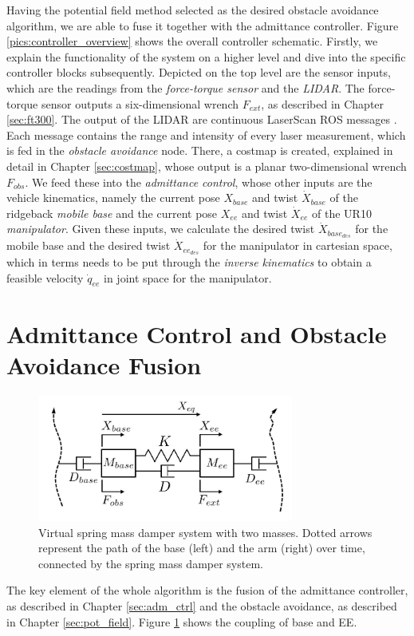 Having the potential field method selected as the desired obstacle avoidance algorithm, we are able to fuse it together with the admittance controller. Figure \ref{pics:controller_overview} shows the overall controller schematic. Firstly, we explain the functionality of the system on a higher level and dive into the specific controller blocks subsequently. Depicted on the top level are the sensor inputs, which are the readings from the \emph{force-torque sensor} and the \emph{LIDAR}. The force-torque sensor outputs a six-dimensional wrench $F_{ext}$, as described in Chapter \ref{sec:ft300}. The output of the LIDAR are continuous LaserScan ROS messages \citep{rosLaserscan}. Each message contains the range and intensity of every laser measurement, which is fed in the \emph{obstacle avoidance} node. There, a costmap is created, explained in detail in Chapter \ref{sec:costmap}, whose output is a planar two-dimensional wrench $F_{obs}$. We feed these into the \emph{admittance control}, whose other inputs are the vehicle kinematics, namely the current pose $X_{base}$ \citep{rosPose} and twist $\dot{X}_{base}$ \citep{rosTwist} of the ridgeback \emph{mobile base} and the current pose $X_{ee}$ and twist $\dot{X}_{ee}$ of the UR10 \emph{manipulator}. Given these inputs, we calculate the desired twist $\dot{X}_{base_{des}}$ for the mobile base and the desired twist $\dot{X}_{ee_{des}}$ for the manipulator in cartesian space, which in terms needs to be put through the \emph{inverse kinematics} to obtain a feasible velocity $\dot{q}_{ee}$ in joint space for the manipulator.

\section{Admittance Control and Obstacle Avoidance Fusion}
\begin{figure}
   \centering
   \includegraphics[width=0.75\textwidth]{images/admittance_model.jpg}
   \caption{Virtual spring mass damper system with two masses. Dotted arrows represent the path of the base (left) and the arm (right) over time, connected by the spring mass damper system.}
   \label{pics:admittance_model}
\end{figure}
The key element of the whole algorithm is the fusion of the admittance controller, as described in Chapter \ref{sec:adm_ctrl} and the obstacle avoidance, as described in Chapter \ref{sec:pot_field}. Figure \ref{pics:admittance_model} shows the coupling of base and EE.


